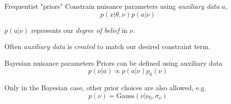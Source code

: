 \documentclass[
aspectratio=169,
14pt,
professionalfonts
]{beamer}
\begin{document}
    
    
    \begin{frame}{Frequentist "priors"}
    Constrain nuisance parameters using \textit{auxiliary data} $a$,
    $$p(x| \theta, \nu) p(a| \nu)$$
    
    $p(a| \nu)$ represents our \textit{degree of belief} in $\nu$.
    
    \vspace{0.5cm}
    
    Often \textit{auxiliary data} is \textit{created} to match our desired constraint term.
    \end{frame}
    
    \begin{frame}{Bayesian nuisance parameters}
    Priors can be defined using auxiliary data
    $$p(\nu|a) \propto p(a|\nu) p_0(\nu)$$
    
    Only in the Bayesian case, other prior choices are also allowed, e.g.
    $$ p(\nu) = \text{Gauss}(\nu | \nu_0, \sigma_\nu)$$
    
    \end{frame}
    
\end{document}
